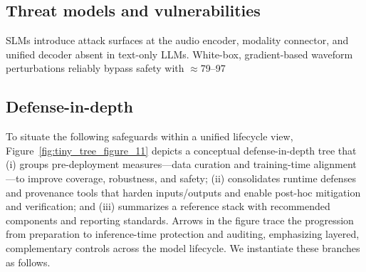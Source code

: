 \documentclass{article}
\begin{document}
\subsection{Threat models and vulnerabilities} \label{subsec:threatmodelsandvulnerabilities}
SLMs introduce attack surfaces at the audio encoder, modality connector, and unified decoder absent in text-only LLMs. White-box, gradient-based waveform perturbations reliably bypass safety with $\approx$79--97%

\subsection{Defense-in-depth} \label{subsec:defense-in-depth}
To situate the following safeguards within a unified lifecycle view, Figure~\ref{fig:tiny_tree_figure_11} depicts a conceptual defense-in-depth tree that (i) groups pre-deployment measures---data curation and training-time alignment---to improve coverage, robustness, and safety; (ii) consolidates runtime defenses and provenance tools that harden inputs/outputs and enable post-hoc mitigation and verification; and (iii) summarizes a reference stack with recommended components and reporting standards. Arrows in the figure trace the progression from preparation to inference-time protection and auditing, emphasizing layered, complementary controls across the model lifecycle. We instantiate these branches as follows.
\end{document}
